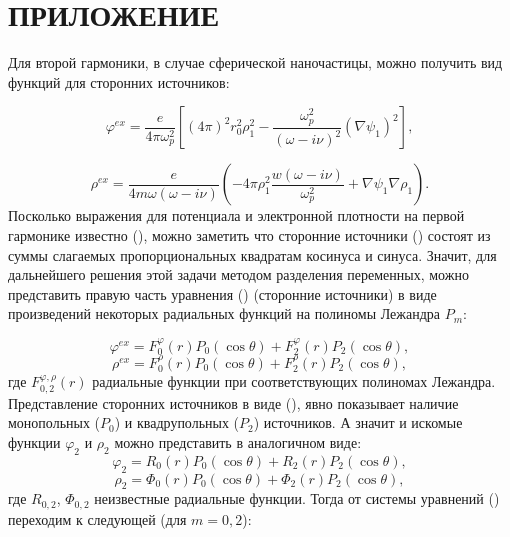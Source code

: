 \documentclass[12pt, a4paper]{article}
\def \w {\omega}
\def \ph {\varphi}
\begin{document}
\section{ПРИЛОЖЕНИЕ}
Для второй гармоники, в случае сферической наночастицы, можно получить вид функций для сторонних источников:

\begin{equation} 	
 \ph^{ex} = \frac{e}{4 \pi \w_p^2}[(4\pi)^2r_0^2\rho_1^2 - \frac{\w_p^2}{(\w - i \nu)^2}(\nabla \psi_1)^2], 
\end{equation}

\begin{equation} 	
\rho^{ex} = \frac{e}{4 m \w(\w - i \nu)}(-4 \pi \rho_1^2 \frac{w(\w - i \nu)}{\w_p^2} + \nabla \psi_1\nabla \rho_1).
\end{equation}
Посколько выражения для потенциала и электронной плотности на первой гармонике известно (), можно заметить что сторонние источники () состоят из суммы слагаемых пропорциональных квадратам косинуса и синуса. Значит, для дальнейшего решения этой задачи методом разделения переменных, можно представить правую часть уравнения () (сторонние источники) в виде произведений некоторых радиальных функций на
полиномы Лежандра $P_m$:

\begin{equation} 	
	\ph^{ex} = F_0^\ph(r)P_0(\cos\theta) + F_2^\ph(r)P_2(\cos\theta),
\end{equation}
\begin{equation} 	
	\rho^{ex} = F_0^\rho(r)P_0(\cos\theta) + F_2^\rho(r)P_2(\cos\theta),
\end{equation}
где $F_{0,2}^{\ph,\rho}(r)$ радиальные функции при соответствующих полиномах
Лежандра. Представление сторонних источников в виде (), явно
показывает наличие монопольных ($P_0$) и квадрупольных ($P_2$) источников. А
значит и искомые функции $\ph_2$ и $\rho_2$ можно представить в аналогичном виде:
\begin{equation} 	
	\ph_2 = R_0(r)P_0(\cos\theta) + R_2(r)P_2(\cos\theta),
\end{equation}
\begin{equation} 	
	\rho_2 = \Phi_0(r)P_0(\cos\theta) + \Phi_2(r)P_2(\cos\theta),
\end{equation}
где $R_{0,2}$, $\Phi_{0,2}$ неизвестные радиальные функции. Тогда от системы уравнений
() переходим к следующей (для $m=0,2$):
\end{document}
